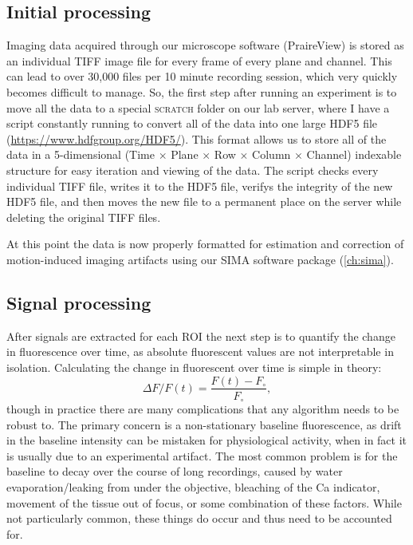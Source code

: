 \subsection{Initial processing}
\label{sec:intro:techniques:inital}
Imaging data acquired through our microscope software (PraireView) is stored as an individual TIFF image file for every frame of every plane and channel.
This can lead to over 30,000 files per 10 minute recording session, which very quickly becomes difficult to manage.
So, the first step after running an experiment is to move all the data to a special \textsc{scratch} folder on our lab server, where I have a script constantly running to convert all of the data into one large HDF5 file (\url{https://www.hdfgroup.org/HDF5/}).
This format allows us to store all of the data in a 5-dimensional (Time $\times$ Plane $\times$ Row $\times$ Column $\times$ Channel) indexable structure for easy iteration and viewing of the data.
The script checks every individual TIFF file, writes it to the HDF5 file, verifys the integrity of the new HDF5 file, and then moves the new file to a permanent place on the server while deleting the original TIFF files.

At this point the data is now properly formatted for estimation and correction of motion-induced imaging artifacts using our SIMA software package (\autoref{ch:sima}).


\subsection{Signal processing}
After signals are extracted for each ROI the next step is to quantify the change in fluorescence over time, as absolute fluorescent values are not interpretable in isolation.
Calculating the change in fluorescent over time is simple in theory: $$\Delta F/F(t) = \frac{F(t) - F_{\circ}}{F_{\circ}},$$ though in practice there are many complications that any algorithm needs to be robust to.
The primary concern is a non-stationary baseline fluorescence, as drift in the baseline intensity can be mistaken for physiological activity, when in fact it is usually due to an experimental artifact.
The most common problem is for the baseline to decay over the course of long recordings, caused by water evaporation/leaking from under the objective, bleaching of the Ca indicator, movement of the tissue out of focus, or some combination of these factors.
While not particularly common, these things do occur and thus need to be accounted for.

